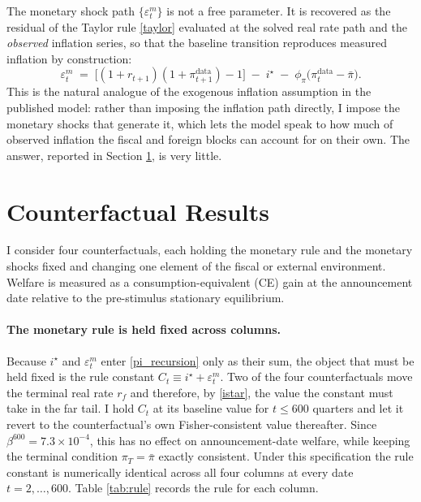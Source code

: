 The monetary shock path $\{\varepsilon^m_t\}$ is not a free parameter. It is
recovered as the residual of the Taylor rule \eqref{taylor} evaluated at the
solved real rate path and the \emph{observed} inflation series, so that the
baseline transition reproduces measured inflation by construction:
\begin{equation}\label{epsm}
  \varepsilon^m_t \;=\; \bigl[(1+r_{t+1})(1+\pi^{\text{data}}_{t+1}) - 1\bigr]
  \;-\; i^\star \;-\; \phi_\pi\bigl(\pi^{\text{data}}_t - \bar\pi\bigr).
\end{equation}
This is the natural analogue of the exogenous inflation assumption in the
published model: rather than imposing the inflation path directly, I impose the
monetary shocks that generate it, which lets the model speak to how much of
observed inflation the fiscal and foreign blocks can account for on their own.
The answer, reported in Section \ref{results}, is very little.

\section{Counterfactual Results} \label{results}

I consider four counterfactuals, each holding the monetary rule and the monetary
shocks fixed and changing one element of the fiscal or external environment.
Welfare is measured as a consumption-equivalent (CE) gain at the announcement
date relative to the pre-stimulus stationary equilibrium.

\paragraph{The monetary rule is held fixed across columns.} Because $i^\star$
and $\varepsilon^m_t$ enter \eqref{pi_recursion} only as their sum, the object
that must be held fixed is the rule constant
$C_t \equiv i^\star + \varepsilon^m_t$. Two of the four counterfactuals move the
terminal real rate $r_f$ and therefore, by \eqref{istar}, the value the constant
must take in the far tail. I hold $C_t$ at its baseline value for
$t \leq 600$ quarters and let it revert to the counterfactual's own
Fisher-consistent value thereafter. Since $\beta^{600}=7.3\times10^{-4}$, this
has no effect on announcement-date welfare, while keeping the terminal condition
$\pi_T=\bar\pi$ exactly consistent. Under this specification the rule constant
is numerically identical across all four columns at every date
$t=2,\dots,600$. Table \ref{tab:rule} records the rule for each column.

